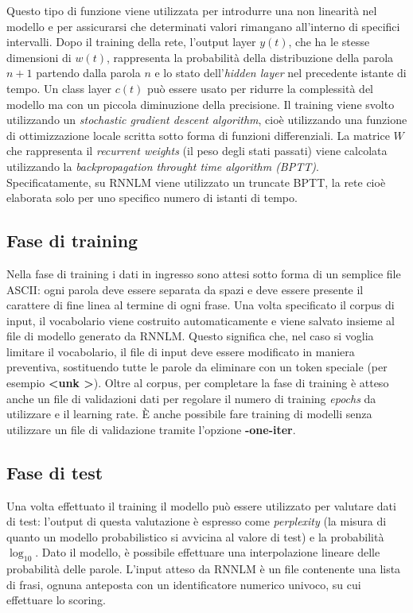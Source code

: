 \documentclass[a4paper,12pt,openright,twoside]{report}
\theoremstyle{definition}
\begin{document}
Questo tipo di funzione viene utilizzata per introdurre una non linearità nel modello e per
assicurarsi che determinati  valori rimangano all'interno di specifici intervalli.
Dopo il training della rete, l'output layer $y(t)$, che ha le stesse dimensioni di $w(t)$,
rappresenta la probabilità della distribuzione della parola $n+1$ partendo dalla parola $n$ 
e lo stato dell'\emph{hidden layer} nel precedente istante di tempo.
Un class layer $c(t)$ può essere usato per ridurre la complessità del modello ma con un piccola
diminuzione della precisione.
Il training viene svolto utilizzando un \emph{stochastic gradient descent algorithm}, cioè utilizzando
una funzione di ottimizzazione locale scritta sotto forma di funzioni differenziali. La matrice $W$
che rappresenta il \emph{recurrent weights} (il peso degli stati passati) viene calcolata utilizzando la 
\emph{backpropagation throught time algorithm (BPTT)}.
Specificatamente, su RNNLM viene utilizzato un truncate BPTT, la rete cioè elaborata solo per uno specifico
numero di istanti di tempo.

\subsection{Fase di training}
Nella fase di training i dati in ingresso sono attesi sotto forma di un semplice file ASCII: ogni parola
deve essere separata da spazi e deve essere presente il carattere di
fine linea al termine di ogni frase.
Una volta specificato il corpus di input, il vocabolario viene costruito automaticamente e viene salvato insieme 
al file di modello generato da RNNLM.
Questo significa che, nel caso si voglia limitare il vocabolario, il file di input deve essere modificato in maniera
preventiva, sostituendo
tutte le parole da eliminare con un token speciale (per esempio \textbf{\textless unk \textgreater}).
Oltre al corpus, per completare la fase di training è atteso anche un
file di validazioni dati per regolare il numero di training \emph{epochs} da utilizzare e  il learning rate.
\`E anche possibile fare training di modelli senza utilizzare un file di validazione tramite l'opzione \textbf{-one-iter}.
\subsection{Fase di test}
Una volta effettuato il training il modello può essere utilizzato per valutare dati di test:
l'output di questa valutazione è espresso come \emph{perplexity} (la misura di quanto un modello probabilistico
si avvicina al valore di test) e la 
probabilità $\log_{10}$.
Dato il modello, è possibile effettuare una interpolazione lineare delle probabilità delle parole. L'input atteso
da RNNLM è un file contenente una lista di frasi, ognuna anteposta con un identificatore
numerico univoco, su cui effettuare lo scoring.
\end{document}
